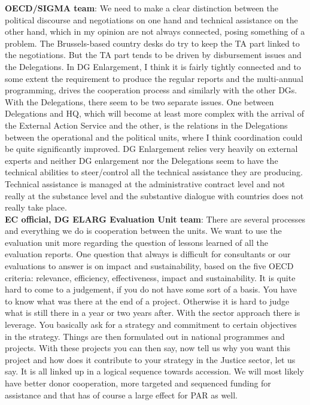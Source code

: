 \textbf{OECD/SIGMA team}: We need to make a clear distinction between the political discourse and negotiations on one hand and technical assistance on the other hand, which in my opinion are not always connected, posing something of a problem. The Brussels-based country desks do try to keep the TA part linked to the negotiations. But the TA part tends to be driven by disbursement issues and the Delegations. In DG Enlargement, I think it is fairly tightly connected and to some extent the requirement to produce the regular reports and the multi-annual programming, drives the cooperation process and similarly with the other DGs. With the Delegations, there seem to be two separate issues. One between Delegations and HQ, which will become at least more complex with the arrival of the External Action Service and the other, is the relations in the Delegations between the operational and the political units, where I think coordination could be quite significantly improved. DG Enlargement relies very heavily on external experts and neither DG enlargement nor the Delegations seem to have the technical abilities to steer/control all the technical assistance they are producing. Technical assistance is managed at the administrative contract level and not really at the substance level and the substantive dialogue with countries does not really take place. \\
\textbf{EC official, DG ELARG Evaluation Unit team}: There are several processes and everything we do is cooperation between the units. We want to use the evaluation unit more regarding the question of lessons learned of all the evaluation reports. One question that always is difficult for consultants or our evaluations to answer is on impact and sustainability, based on the five OECD criteria: relevance, efficiency, effectiveness, impact and sustainability. It is quite hard to come to a judgement, if you do not have some sort of a basis. You have to know what was there at the end of a project. Otherwise it is hard to judge what is still there in a year or two years after. With the sector approach there is leverage. You basically ask for a strategy and commitment to certain objectives in the strategy. Things are then formulated out in national programmes and projects. With these projects you can then say, now tell us why you want this project and how does it contribute to your strategy in the Justice sector, let us say. It is all linked up in a logical sequence towards accession. We will most likely have better donor cooperation, more targeted and sequenced funding for assistance and that has of course a large effect for PAR as well.\\
